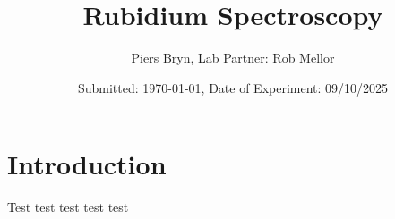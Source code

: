 \documentclass[11pt,twocolumn]{revtex4-2}
\begin{document}
\lstset{language=Python, autogobble=true}

\title{Rubidium Spectroscopy}
\author{Piers Bryn, Lab Partner: Rob Mellor}
\date{Submitted: \today{}, Date of Experiment: 09/10/2025}

\maketitle
\thispagestyle{plain} %

\section{\label{sec:Intro} Introduction}

Test test test test test 
\end{document}
